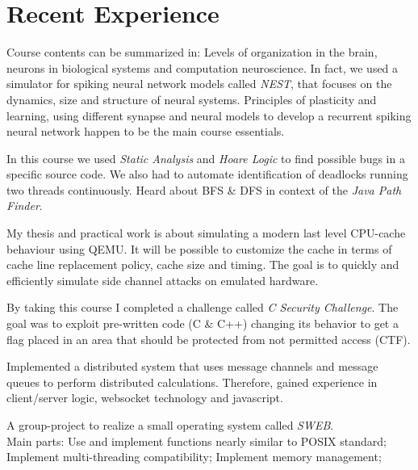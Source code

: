 \documentclass[]{resume}
\begin{document}
\begin{minipage}[t]{0.66\textwidth} 
	\section{Recent Experience} 
		Course contents can be summarized in: Levels of organization in the brain, neurons in biological systems and computation neuroscience. In fact, we used a simulator for spiking neural network models called \textit{NEST}, that focuses on the dynamics, size and structure of neural systems. Principles of plasticity and learning, using different synapse and neural models to develop a recurrent spiking neural network happen to be the main course essentials. \sectionsep
	
		In this course we used \textit{Static Analysis} and \textit{Hoare Logic} to find possible bugs in a specific source code. We also had to automate identification of deadlocks running two threads continuously. Heard about BFS \& DFS in context of the \textit{Java Path Finder}.  \sectionsep
	
		My thesis and practical work is about simulating a modern last level CPU-cache behaviour using QEMU. It will be possible to customize the cache in terms of cache line replacement policy, cache size and timing. The goal is to quickly and efficiently simulate side channel attacks on emulated hardware. \sectionsep
	
		By taking this course I completed a challenge called \textit{C Security Challenge}. The goal was to exploit pre-written code (C \& C++) changing its behavior to get a flag placed in an area that should be protected from not permitted access (CTF). \sectionsep
		
		Implemented a distributed system that uses message channels and message queues to perform distributed calculations. Therefore, gained experience in client/server logic, websocket technology and javascript. \sectionsep
		
		A group-project to realize a small operating system called \textit{SWEB}. \\ 
		Main parts: Use and implement functions nearly similar to POSIX standard; Implement multi-threading compatibility; Implement memory management;\sectionsep 
		
\end{minipage} 
\vfill \vfill \vfill \vfill
\end{document}
